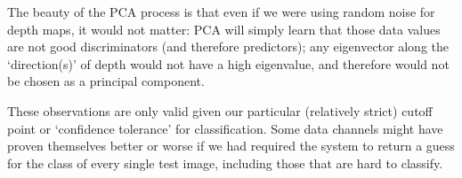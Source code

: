 The beauty of the PCA process is that even if we were using random noise for depth maps, it would not matter: PCA will simply learn that those data values are not good discriminators (and therefore predictors); any eigenvector along the `direction(s)' of depth would not have a high eigenvalue, and therefore would not be chosen as a principal component.

These observations are only valid given our particular (relatively strict) cutoff point or `confidence tolerance' for classification. Some data channels might have proven themselves better or worse if we had required the system to return a guess for the class of every single test image, including those that are hard to classify.

\begin{figure}[p]
 \centering

 \\


\end{figure}
